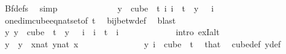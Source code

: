 \begin{isabellebody}
\ Bf{\isacharunderscore}{\kern0pt}defs\ \isamarkupfalse%
\ simp\isanewline
\ \ \ \ \ \ \ \ \ \ \isamarkupfalse%
\ \isamarkupfalse%
\ {\isachardoublequoteopen}{\isasymforall}y\ {\isasymin}\ cube\ {}\ t{\isachardot}{\kern0pt}\ {\isacharparenleft}{\kern0pt}{\isasymexists}{\isacharbang}{\kern0pt}i{\isachardot}{\kern0pt}\ i\ {\isacharless}{\kern0pt}\ t\ {\isasymand}\ y\ {}\ {\isacharequal}{\kern0pt}\ i{\isacharparenright}{\kern0pt}{\isachardoublequoteclose}\ \isamarkupfalse%
\ one{\isacharunderscore}{\kern0pt}dim{\isacharunderscore}{\kern0pt}cube{\isacharunderscore}{\kern0pt}eq{\isacharunderscore}{\kern0pt}nat{\isacharunderscore}{\kern0pt}set{\isacharbrackleft}{\kern0pt}of\ {\isachardoublequoteopen}t{\isachardoublequoteclose}{\isacharbrackright}{\kern0pt}\ \isamarkupfalse%
\ bij{\isacharunderscore}{\kern0pt}betw{\isacharunderscore}{\kern0pt}def\ \isamarkupfalse%
\ blast\isanewline
\ \ \ \ \ \ \ \ \ \ \isamarkupfalse%
\ \isamarkupfalse%
\ {\isachardoublequoteopen}{\isasymexists}{\isacharbang}{\kern0pt}y{\isachardot}{\kern0pt}\ y\ {\isasymin}\ cube\ {}\ t\ {\isasymand}\ y\ {}\ {\isacharequal}{\kern0pt}\ i{\isachardoublequoteclose}\ \ {\isachardoublequoteopen}i\ {\isacharless}{\kern0pt}\ t{\isachardoublequoteclose}\ \ i\ \isanewline
\ \ \ \ \ \ \ \ \ \ \isamarkupfalse%
\ {\isacharparenleft}{\kern0pt}intro\ ex{}I{\isacharunderscore}{\kern0pt}alt{\isacharparenright}{\kern0pt}\isanewline
\ \ \ \ \ \ \ \ \ \ \ \ \isamarkupfalse%
\ y\ \ {\isachardoublequoteopen}y\ {\isasymequiv}\ {\isacharparenleft}{\kern0pt}{\isasymlambda}x{\isacharcolon}{\kern0pt}{\isacharcolon}{\kern0pt}nat{\isachardot}{\kern0pt}\ {\isasymlambda}y{\isasymin}{\isacharbraceleft}{\kern0pt}{\isachardot}{\kern0pt}{\isachardot}{\kern0pt}{\isacharless}{\kern0pt}{}{\isacharcolon}{\kern0pt}{\isacharcolon}{\kern0pt}nat{\isacharbraceright}{\kern0pt}{\isachardot}{\kern0pt}\ x{\isacharparenright}{\kern0pt}{\isachardoublequoteclose}\ \isanewline
\ \ \ \ \ \ \ \ \ \ \ \ \isamarkupfalse%
\ {\isachardoublequoteopen}y\ i\ {\isasymin}\ {\isacharparenleft}{\kern0pt}cube\ {}\ t{\isacharparenright}{\kern0pt}{\isachardoublequoteclose}\ \isamarkupfalse%
\ that\ \isamarkupfalse%
\ cube{\isacharunderscore}{\kern0pt}def\ y{\isacharunderscore}{\kern0pt}def\ \isamarkupfalse%

\end{isabellebody}
